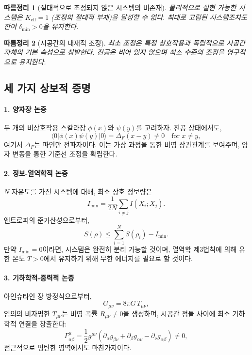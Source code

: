 \documentclass[11pt,a4paper]{article}
\newtheorem{corollary}{따름정리}
\begin{document}
\begin{corollary}[절대적으로 조정되지 않은 시스템의 비존재]
	물리적으로 실현 가능한 시스템은 $K_{\mathrm{eff}} = 1$ (조정의 절대적 부재)을 달성할 수 없다. 최대로 고립된 시스템조차도 잔여 $\delta_{\min} > 0$을 유지한다.
\end{corollary}

\begin{corollary}[시공간의 내재적 조정]
	최소 조정은 특정 상호작용과 독립적으로 시공간 자체의 기본 속성으로 창발한다. 진공은 비어 있지 않으며 최소 수준의 조정을 영구적으로 유지한다.
\end{corollary}

\subsection{세 가지 상보적 증명}

\paragraph*{1. 양자장 논증}
두 개의 비상호작용 스칼라장 $\phi(x)$와 $\psi(y)$를 고려하자. 진공 상태에서도,
\[
\langle 0 | \phi(x) \psi(y) | 0 \rangle = \Delta_F(x-y) \neq 0 \quad \text{for } x \neq y,
\]
여기서 $\Delta_F$는 파인만 전파자이다. 이는 가상 과정을 통한 비영 상관관계를 보여주며, 양자 변동을 통한 기준선 조정을 확립한다.

\paragraph*{2. 정보-열역학적 논증}
$N$ 자유도를 가진 시스템에 대해, 최소 상호 정보량은
\[
I_{\min} = \frac{1}{2N} \sum_{i \neq j} I(X_i; X_j).
\]
엔트로피의 준가산성으로부터,
\[
S(\rho) \leq \sum_{i=1}^N S(\rho_i) - I_{\min}.
\]
만약 $I_{\min}=0$이라면, 시스템은 완전히 분리 가능할 것이며, 열역학 제3법칙에 의해 유한 온도 $T>0$에서 유지하기 위해 무한 에너지를 필요로 할 것이다.

\paragraph*{3. 기하학적-중력적 논증}
아인슈타인 장 방정식으로부터,
\[
G_{\mu\nu} = 8\pi G \, T_{\mu\nu},
\]
임의의 비자명한 $T_{\mu\nu}$는 비영 곡률 $R_{\mu\nu} \neq 0$을 생성하며, 시공간 점들 사이에 최소 기하학적 연결을 창출한다:
\[
\Gamma^{\mu}_{\alpha\beta} = \frac{1}{2} g^{\mu\nu}(\partial_\alpha g_{\beta\nu} + \partial_\beta g_{\alpha\nu} - \partial_\nu g_{\alpha\beta}) \neq 0,
\]
점근적으로 평탄한 영역에서도 마찬가지이다.
\end{document}

